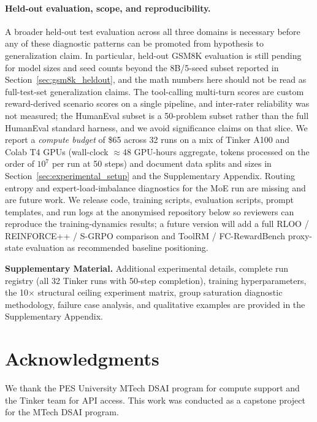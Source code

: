 \documentclass{article}
\begin{document}
\paragraph{Held-out evaluation, scope, and reproducibility.} A broader held-out test evaluation across all three domains is necessary before any of these diagnostic patterns can be promoted from hypothesis to generalization claim. In particular, held-out GSM8K evaluation is still pending for model sizes and seed counts beyond the 8B/5-seed subset reported in Section~\ref{sec:gsm8k_heldout}, and the math numbers here should not be read as full-test-set generalization claims. The tool-calling multi-turn scores are custom reward-derived scenario scores on a single pipeline, and inter-rater reliability was not measured; the HumanEval subset is a 50-problem subset rather than the full HumanEval standard harness, and we avoid significance claims on that slice. We report a \emph{compute budget} of \$65 across 32 runs on a mix of Tinker A100 and Colab T4 GPUs (wall-clock $\approx$48 GPU-hours aggregate, tokens processed on the order of $10^7$ per run at 50 steps) and document data splits and sizes in Section~\ref{sec:experimental_setup} and the Supplementary Appendix. Routing entropy and expert-load-imbalance diagnostics for the MoE run are missing and are future work. We release code, training scripts, evaluation scripts, prompt templates, and run logs at the anonymised repository below so reviewers can reproduce the training-dynamics results; a future version will add a full RLOO / REINFORCE++ / S-GRPO comparison and ToolRM / FC-RewardBench proxy-state evaluation as recommended baseline positioning.

\medskip

\textbf{Supplementary Material.} Additional experimental details, complete run registry (all 32 Tinker runs with 50-step completion), training hyperparameters, the 10$\times$ structural ceiling experiment matrix, group saturation diagnostic methodology, failure case analysis, and qualitative examples are provided in the Supplementary Appendix.

\section*{Acknowledgments}

We thank the PES University MTech DSAI program for compute support and the Tinker team for API access. This work was conducted as a capstone project for the MTech DSAI program.
\end{document}
